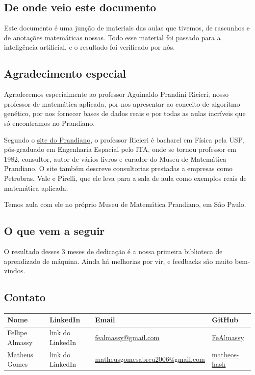\documentclass[11pt,a4paper]{article}
\newcommand{\falta}[1]{\colorbox{amarelo!35}{\small #1}}
\newenvironment{tabela}{\par\nopagebreak[4]\vspace{0.3em}\nopagebreak[4]\begingroup\centering\small}{\par\endgroup\vspace{0.6em}}
\begin{document}
\subsection{De onde veio este documento}

Este documento é uma junção de materiais das aulas que tivemos, de rascunhos e de anotações matemáticas nossas. Todo esse material foi passado para a inteligência artificial, e o resultado foi verificado por nós.

\subsection{Agradecimento especial}

Agradecemos especialmente ao professor Aguinaldo Prandini Ricieri, nosso professor de matemática aplicada, por nos apresentar ao conceito de algoritmo genético, por nos fornecer bases de dados reais e por todas as aulas incríveis que só encontramos no Prandiano.

Segundo o \href{https://www.prandiano.com.br/ricieri}{site do Prandiano}, o professor Ricieri é bacharel em Física pela USP, pós-graduado em Engenharia Espacial pelo ITA, onde se tornou professor em 1982, consultor, autor de vários livros e curador do Museu de Matemática Prandiano. O site também descreve consultorias prestadas a empresas como Petrobras, Vale e Pirelli, que ele leva para a sala de aula como exemplos reais de matemática aplicada.

Temos aula com ele no próprio Museu de Matemática Prandiano, em São Paulo.

\subsection{O que vem a seguir}

O resultado desses 3 meses de dedicação é a nossa primeira biblioteca de aprendizado de máquina. Ainda há melhorias por vir, e feedbacks são muito bem-vindos.

\subsection{Contato}

\begin{tabela}
\begin{tabular}{llll}
\toprule
Nome & LinkedIn & Email & GitHub\\
\midrule
Fellipe Almassy & \falta{link do LinkedIn} & \href{mailto:fealmassy@gmail.com}{fealmassy@gmail.com} & \href{https://github.com/FeAlmassy}{FeAlmassy}\\
Matheus Gomes & \falta{link do LinkedIn} & \href{mailto:matheusgomesabreu2006@gmail.com}{matheusgomesabreu2006@gmail.com} & \href{https://github.com/matheos-hash}{matheos-hash}\\
\bottomrule
\end{tabular}
\end{tabela}
\end{document}
